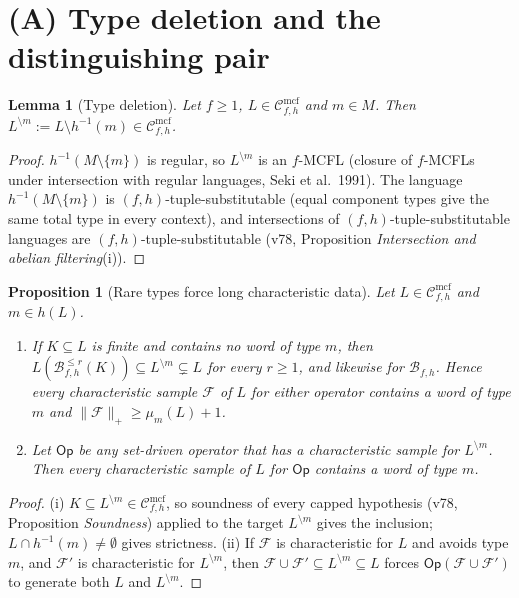 \documentclass[11pt]{article}
\newtheorem{lemma}[theorem]{Lemma}
\newtheorem{proposition}[theorem]{Proposition}
\theoremstyle{definition}
\theoremstyle{remark}
\newcommand{\Cmcf}[2]{\mathcal{C}^{\mathrm{mcf}}_{#1,#2}}
\newcommand{\B}{\mathcal B}
\begin{document}
\section{(A) Type deletion and the distinguishing pair}

\begin{lemma}[Type deletion]\label{lem:type-deletion}
Let $f\ge1$, $L\in\Cmcf{f}{h}$ and $m\in M$.  Then
$L^{\setminus m}:=L\setminus h^{-1}(m)\in\Cmcf{f}{h}$.
\end{lemma}
\begin{proof}
$h^{-1}(M\setminus\{m\})$ is regular, so $L^{\setminus m}$ is an $f$-MCFL
(closure of $f$-MCFLs under intersection with regular languages,
Seki et al.\ 1991).  The language $h^{-1}(M\setminus\{m\})$ is
$(f,h)$-tuple-substitutable (equal component types give the same total type
in every context), and intersections of $(f,h)$-tuple-substitutable
languages are $(f,h)$-tuple-substitutable (v78, Proposition
\emph{Intersection and abelian filtering}(i)).
\end{proof}

\begin{proposition}[Rare types force long characteristic data]
\label{prop:rare-type}
Let $L\in\Cmcf{f}{h}$ and $m\in h(L)$.
\begin{enumerate}[label=(\roman*)]
\item If $K\subseteq L$ is finite and contains no word of type $m$, then
$L(\B^{\le r}_{f,h}(K))\subseteq L^{\setminus m}\subsetneq L$ for every
$r\ge1$, and likewise for $\B_{f,h}$.  Hence every characteristic sample
$\mathcal F$ of $L$ for either operator contains a word of type $m$ and
$\|\mathcal F\|_+\ge\mu_m(L)+1$.
\item Let $\mathsf{Op}$ be any set-driven operator that has a characteristic
sample for $L^{\setminus m}$.  Then every characteristic sample of $L$ for
$\mathsf{Op}$ contains a word of type $m$.
\end{enumerate}
\end{proposition}
\begin{proof}
(i) $K\subseteq L^{\setminus m}\in\Cmcf{f}{h}$, so soundness of every
capped hypothesis (v78, Proposition \emph{Soundness}) applied to the target
$L^{\setminus m}$ gives the inclusion; $L\cap h^{-1}(m)\neq\emptyset$ gives
strictness.  (ii) If $\mathcal F$ is characteristic for $L$ and avoids type
$m$, and $\mathcal F'$ is characteristic for $L^{\setminus m}$, then
$\mathcal F\cup\mathcal F'\subseteq L^{\setminus m}\subseteq L$ forces
$\mathsf{Op}(\mathcal F\cup\mathcal F')$ to generate both $L$ and
$L^{\setminus m}$.
\end{proof}
\end{document}
